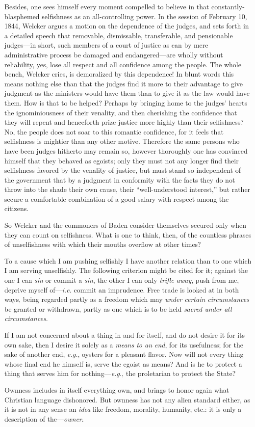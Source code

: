 Besides, one sees himself every moment compelled to believe in that 
constantly-blasphemed selfishness as an all-controlling power. In the session 
of February 10, 1844, Welcker argues a motion on the dependence of the judges, 
and sets forth in a detailed speech that removable, dismissable, transferable, 
and pensionable judges---in short, such members of a court of justice as can 
by mere administrative process be damaged and endangered---are wholly without 
reliability, yes, lose all respect and all confidence among the people. The 
whole bench, Welcker cries, is demoralized by this dependence! In blunt words 
this means nothing else than that the judges find it more to their advantage 
to give judgment as the ministers would have them than to give it as the law 
would have them. How is that to be helped? Perhaps by bringing home to the 
judges' hearts the ignominiousness of their venality, and then cherishing the 
confidence that they will repent and henceforth prize justice more highly than 
their selfishness? No, the people does not soar to this romantic confidence, 
for it feels that selfishness is mightier than any other motive. Therefore the 
same persons who have been judges hitherto may remain so, however thoroughly 
one has convinced himself that they behaved as egoists; only they must not any 
longer find their selfishness favored by the venality of justice, but must 
stand so independent of the government that by a judgment in conformity with 
the facts they do not throw into the shade their own cause, their 
``well-understood interest,'' but rather secure a comfortable combination of 
a good salary with respect among the citizens.

So Welcker and the commoners of Baden consider themselves secured only when 
they can count on selfishness. What is one to think, then, of the countless 
phrases of unselfishness with which their mouths overflow at other times?

To a cause which I am pushing selfishly I have another relation than to one 
which I am serving unselfishly. The following criterion might be cited for it; 
against the one I can \textit{sin} or commit a \textit{sin}, the other I can 
only \textit{trifle away}, push from me, deprive myself of---\textit{i.e.} 
commit an imprudence. Free trade is looked at in both ways, being regarded 
partly as a freedom which may \textit{under certain circumstances} be granted 
or withdrawn, partly as one which is to be held \textit{sacred under all 
circumstances}.

If I am not concerned about a thing in and for itself, and do not desire it 
for its own sake, then I desire it solely as a \textit{means to an end}, for 
its usefulness; for the sake of another end, \textit{e.g.}, oysters for a 
pleasant flavor. Now will not every thing whose final end he himself is, serve 
the egoist as means? And is he to protect a thing that serves him for nothing---\textit{e.g.}, the proletarian to protect the State?

Ownness includes in itself everything own, and brings to honor again what 
Christian language dishonored. But ownness has not any alien standard either, 
as it is not in any sense an \textit{idea} like freedom, morality, humanity, 
etc.: it is only a description of the---\textit{owner}.
